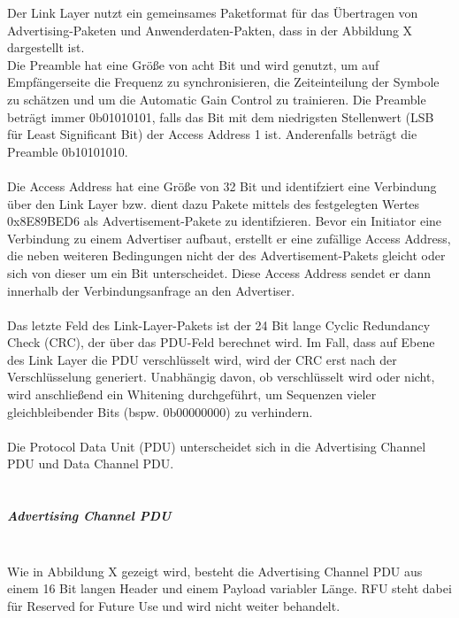 Der Link Layer nutzt ein gemeinsames Paketformat für das Übertragen von Advertising-Paketen und Anwenderdaten-Pakten, dass in der Abbildung X
dargestellt ist.\\

Die Preamble hat eine Größe von acht Bit und wird genutzt, um auf Empfängerseite die Frequenz zu synchronisieren, die Zeiteinteilung der Symbole zu schätzen und um die Automatic Gain Control zu trainieren. Die Preamble beträgt immer 0b01010101, falls das Bit mit dem niedrigsten Stellenwert (LSB für Least Significant Bit) der Access Address 1 ist. Anderenfalls beträgt die Preamble 0b10101010.
\\\\
Die Access Address hat eine Größe von 32 Bit und identifziert eine Verbindung über den Link Layer bzw. dient dazu Pakete mittels des festgelegten Wertes 0x8E89BED6 als Advertisement-Pakete zu identifzieren. Bevor ein Initiator eine Verbindung zu einem Advertiser aufbaut, erstellt er eine zufällige Access Address, die neben weiteren Bedingungen nicht der des Advertisement-Pakets gleicht oder sich von dieser um ein Bit unterscheidet. Diese Access Address sendet er dann innerhalb der Verbindungsanfrage an den Advertiser.
\\\\
Das letzte Feld des Link-Layer-Pakets ist der 24 Bit lange Cyclic Redundancy Check (CRC), der über das PDU-Feld berechnet wird. Im Fall, dass auf Ebene des Link Layer die PDU verschlüsselt wird, wird der CRC erst nach der Verschlüsselung generiert. Unabhängig davon, ob verschlüsselt wird oder nicht, wird anschließend ein Whitening durchgeführt, um Sequenzen vieler gleichbleibender Bits (bspw. 0b00000000) zu verhindern.
\\\\
Die Protocol Data Unit (PDU) unterscheidet sich in die Advertising Channel PDU und Data Channel PDU.
\\\\

\subparagraph{Advertising Channel PDU} \mbox{} \vspace{0.2cm} \\
Wie in Abbildung X 
gezeigt wird, besteht die Advertising Channel PDU aus einem 16 Bit langen Header und einem Payload variabler Länge. RFU steht dabei für Reserved for Future Use und wird nicht weiter behandelt.


